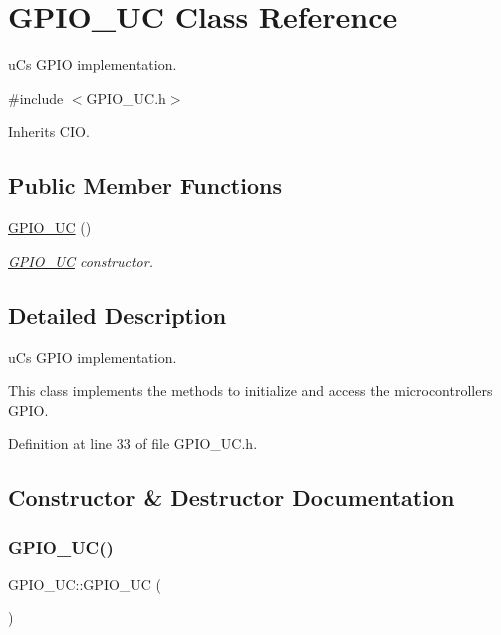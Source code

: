 \hypertarget{class_g_p_i_o___u_c}{}\section{G\+P\+I\+O\+\_\+\+UC Class Reference}
\label{class_g_p_i_o___u_c}


uC\textquotesingle{}s G\+P\+IO implementation.  




{\ttfamily \#include $<$G\+P\+I\+O\+\_\+\+U\+C.\+h$>$}



Inherits C\+IO.

\subsection*{Public Member Functions}
\begin{DoxyCompactItemize}
\item 
\mbox{\hyperlink{class_g_p_i_o___u_c_a3be8b1aed802a745a0be7760a4e8f2cd}{G\+P\+I\+O\+\_\+\+UC}} ()
\begin{DoxyCompactList}\small\item\em \mbox{\hyperlink{class_g_p_i_o___u_c}{G\+P\+I\+O\+\_\+\+UC}} constructor. \end{DoxyCompactList}\end{DoxyCompactItemize}


\subsection{Detailed Description}
uC\textquotesingle{}s G\+P\+IO implementation. 

This class implements the methods to initialize and access the microcontroller\textquotesingle{}s G\+P\+IO. 

Definition at line 33 of file G\+P\+I\+O\+\_\+\+U\+C.\+h.



\subsection{Constructor \& Destructor Documentation}
\mbox{\label{class_g_p_i_o___u_c_a3be8b1aed802a745a0be7760a4e8f2cd}} 
\subsubsection{\texorpdfstring{G\+P\+I\+O\+\_\+\+U\+C()}{GPIO\_UC()}}
{\footnotesize\ttfamily G\+P\+I\+O\+\_\+\+U\+C\+::\+G\+P\+I\+O\+\_\+\+UC (\begin{DoxyParamCaption}{ }\end{DoxyParamCaption})}



